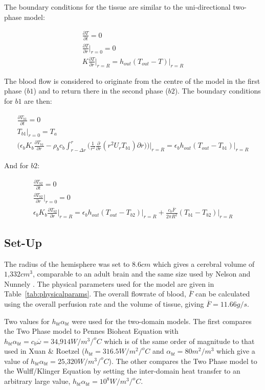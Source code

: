 \documentclass[11pt,english,a4paper,twoside,openright]{report}
\begin{document}
{{{{{{{{The boundary conditions for the tissue are similar to the uni-directional two-phase model:  

\begin{gather}
\frac{\partial T}{\partial t} = 0 \\
\frac{\partial T}{\partial r}\biggr|_{r=0} = 0 \\
K\frac{\partial T}{\partial r}\biggr|_{r=R} = h_{out}(T_{out}-T)\bigr|_{r=R}
\end{gather}

The blood flow is considered to originate from the centre of the model in the first phase ($b1$) and to return there in the second phase ($b2$). The boundary conditions for $b1$ are then: 

\begin{gather}
\frac{\partial T_{b1}}{\partial t} = 0 \\
T_{b1}\bigr|_{r=0} = T_{a} \\
\bigg(\epsilon_{b}K_{b}\frac{\partial T_{b1}}{\partial r} -\rho_{b}c_{b}\int_{r-\Delta r}^{r}\bigg(\frac{1}{r^{2}}\frac{\partial}{\partial r}(r^{2}U_{r}T_{b1})\partial r\bigg)\bigg)\biggr|_{r=R} = \epsilon_{b}h_{out}(T_{out}-T_{b1})\bigr|_{r=R}
\end{gather}

And for $b2$:

\begin{gather}
\frac{\partial T_{b2}}{\partial t} = 0 \\
\frac{\partial T_{b2}}{\partial r}\biggr|_{r=0} = 0 \\
\epsilon_{b}K_{b}\frac{\partial T_{b2}}{\partial r}\biggr|_{r=R} = \epsilon_{b}h_{out}(T_{out}-T_{b2})\bigr|_{r=R} + \frac{c_{b}\overline{F}}{2\pi R^{2}}(T_{b1} - T_{b2})\bigr|_{r=R}
\end{gather}

\subsection{Set-Up}

The radius of the hemisphere was set to $8.6cm$ which gives a cerebral volume of $\text{1,332}cm^{3}$, comparable to an adult brain \cite{hedman2012human} and the same size used by Nelson and Nunnely \cite{nelson1998brain}. The physical parameters used for the model are given in Table~\ref{tab:physicalparams}. The overall flowrate of blood, $\overline{F}$ can be calculated using the overall perfusion rate and the volume of tissue, giving $\overline{F} = 11.66g/s$. 

Two values for $h_{bt}\alpha_{bt}$ were used for the two-domain models. The first compares the Two Phase model to Pennes Bioheat Equation with $h_{bt}\alpha_{bt} = c_{b}\overline{\omega} = \text{34,914}W/m^{3}/^{o}C$ which is of the same order of magnitude to that used in Xuan \& Roetzel \cite{xuan1997bioheat} ($h_{bt} = 316.5 W/m^{2}/^{o}C$ and $\alpha_{bt} = 80m^{2}/m^{3}$ which give a value of $h_{bt}\alpha_{bt} = \text{25,320} W/m^{3}/^{o}C$). The other compares the Two Phase model to the Wulff/Klinger Equation by setting the inter-domain heat transfer to an arbitrary large value, $h_{bt}\alpha_{bt} = 10^8W/m^{3}/^{o}C$.

}}}}}}}}
\end{document}

